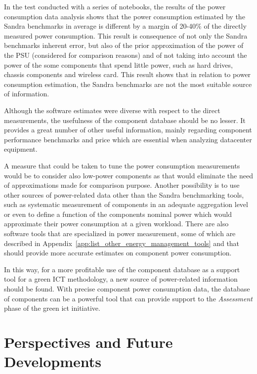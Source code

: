     In the test conducted with a series of notebooks, the results of the power consumption data analysis shows that the power consumption estimated by the Sandra benchmarks in average is different by a margin of 20-40\% of the directly measured power consumption. This result is consequence of not only the Sandra benchmarks inherent error, but also of the prior approximation of the power of the PSU (considered for comparison reasons) and of not taking into account the power of the some components that spend little power, such as hard drives, chassis components and wireless card. This result shows that in relation to power consumption estimation, the Sandra benchmarks are not the most suitable source of information.
    
    Although the software estimates were diverse with respect to the direct measurements, the usefulness of the component database should be no lesser. It provides a great number of other useful information, mainly regarding component performance benchmarks and price which are essential when analyzing datacenter equipment.
    
    A measure that could be taken to tune the power consumption measurements would be to consider also low-power components as that would eliminate the need of approximations made for comparison purpose. Another possibility is to use other sources of power-related data other than the Sandra benchmarking tools, such as systematic measurement of components in an adequate aggregation level or even to define a function of the components nominal power which would approximate their power consumption at a given workload. There are also software tools that are specialized in power measurement, some of which are described in Appendix~\ref{app:list_other_energy_management_tools} and that should provide more accurate estimates on component power consumption.
    
    In this way, for a more profitable use of the component database as a support tool for a green ICT methodology, a new source of power-related information should be found. With precise component power consumption data, the database of components can be a powerful tool that can provide support to the \emph{Assessment} phase of the green ict initiative.
    
    \pagebreak
    \section{Perspectives and Future Developments}

